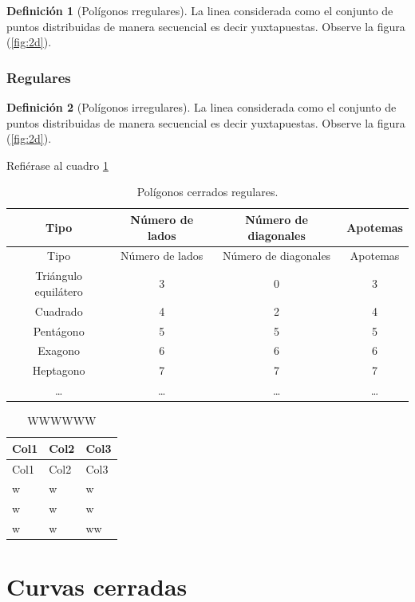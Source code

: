 \documentclass[16pt,]{krantz}
\theoremstyle{definition}
\newtheorem{definition}{Definición}[chapter]
\theoremstyle{definition}
\theoremstyle{definition}
\theoremstyle{definition}
\theoremstyle{remark}
\begin{document}
\begin{definition}[Polígonos rregulares]
\protect\hypertarget{def:irregulares}{}{\label{def:irregulares} {} }La linea considerada como el conjunto de puntos distribuidas de manera secuencial es decir yuxtapuestas. Observe la figura (\ref{fig:2d}).
\end{definition}

\hypertarget{regulares}{%
\subsubsection{Regulares}\label{regulares}}

\begin{definition}[Polígonos irregulares]
\protect\hypertarget{def:regulares}{}{\label{def:regulares} {} }La linea considerada como el conjunto de puntos distribuidas de manera secuencial es decir yuxtapuestas. Observe la figura (\ref{fig:2d}).
\end{definition}

Refiérase al cuadro \ref{tab:regulares}

\begin{longtable}[]{@{}cccc@{}}
\caption{\label{tab:regulares} Polígonos cerrados regulares.}\tabularnewline
\toprule
Tipo & Número de lados & Número de diagonales & Apotemas\tabularnewline
\midrule
\endfirsthead
\toprule
Tipo & Número de lados & Número de diagonales & Apotemas\tabularnewline
\midrule
\endhead
Triángulo equilátero & 3 & 0 & 3\tabularnewline
Cuadrado & 4 & 2 & 4\tabularnewline
Pentágono & 5 & 5 & 5\tabularnewline
Exagono & 6 & 6 & 6\tabularnewline
Heptagono & 7 & 7 & 7\tabularnewline
\ldots{} & \ldots{} & \ldots{} & \ldots{}\tabularnewline
\bottomrule
\end{longtable}

\begin{longtable}[]{@{}lll@{}}
\caption{\label{tab:regular} WWWWWW}\tabularnewline
\toprule
Col1 & Col2 & Col3\tabularnewline
\midrule
\endfirsthead
\toprule
Col1 & Col2 & Col3\tabularnewline
\midrule
\endhead
w & w & w\tabularnewline
w & w & w\tabularnewline
w & w & ww\tabularnewline
\bottomrule
\end{longtable}

\hypertarget{curvas-cerradas}{%
\section{Curvas cerradas}\label{curvas-cerradas}}
\end{document}
